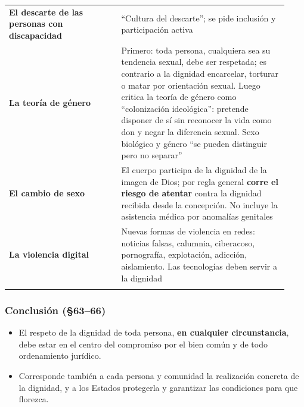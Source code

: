 \documentclass[10pt,a4paper]{article}
\begin{document}
{\begin{longtable}{>{\raggedright\arraybackslash}p{0.375\linewidth}>{\raggedright\arraybackslash}p{0.555\linewidth}}
\textbf{El descarte de las personas con discapacidad} & ``Cultura del descarte''; se pide inclusión y participación activa \\ \addlinespace[2pt]
\textbf{La teoría de género} & Primero: toda persona, cualquiera sea su tendencia sexual, debe ser respetada; es contrario a la dignidad encarcelar, torturar o matar por orientación sexual. Luego critica la teoría de género como ``colonización ideológica'': pretende disponer de sí sin reconocer la vida como don y negar la diferencia sexual. Sexo biológico y género ``se pueden distinguir pero no separar'' \\ \addlinespace[2pt]
\textbf{El cambio de sexo} & El cuerpo participa de la dignidad de la imagen de Dios; por regla general \textbf{corre el riesgo de atentar} contra la dignidad recibida desde la concepción. No incluye la asistencia médica por anomalías genitales \\ \addlinespace[2pt]
\textbf{La violencia digital} & Nuevas formas de violencia en redes: noticias falsas, calumnia, ciberacoso, pornografía, explotación, adicción, aislamiento. Las tecnologías deben servir a la dignidad \\ \addlinespace[2pt]
\bottomrule\end{longtable}}

\subsubsection{Conclusión (\S{}63--66)}
\begin{itemize}
\item El respeto de la dignidad de toda persona, \textbf{en cualquier circunstancia}, debe estar en el centro del compromiso por el bien común y de todo ordenamiento jurídico.
\item Corresponde también a cada persona y comunidad la realización concreta de la dignidad, y a los Estados protegerla y garantizar las condiciones para que florezca.
\end{itemize}
\end{document}
